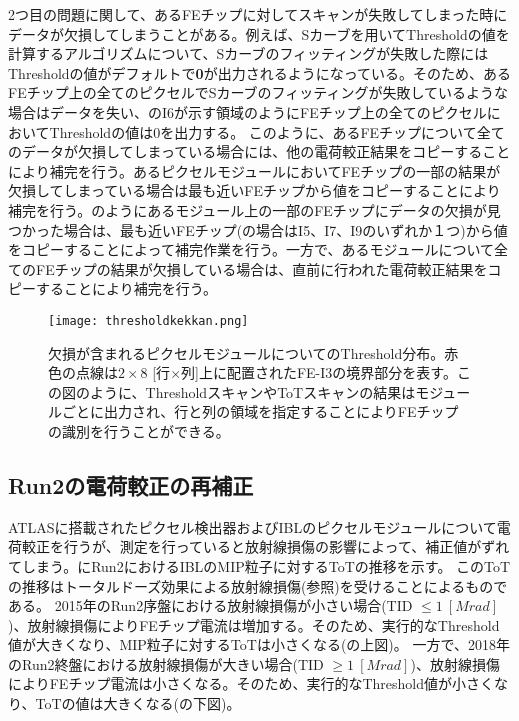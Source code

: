 2つ目の問題に関して、あるFEチップに対してスキャンが失敗してしまった時にデータが欠損してしまうことがある。例えば、Sカーブを用いてThresholdの値を計算するアルゴリズムについて、Sカーブのフィッティングが失敗した際にはThresholdの値がデフォルトで\textbf{0}が出力されるようになっている。そのため、あるFEチップ上の全てのピクセルでSカーブのフィッティングが失敗しているような場合はデータを失い、のI6が示す領域のようにFEチップ上の全てのピクセルにおいてThresholdの値は$0$を出力する。
このように、あるFEチップについて全てのデータが欠損してしまっている場合には、他の電荷較正結果をコピーすることにより補完を行う。あるピクセルモジュールにおいてFEチップの一部の結果が欠損してしまっている場合は最も近いFEチップから値をコピーすることにより補完を行う。のようにあるモジュール上の一部のFEチップにデータの欠損が見つかった場合は、最も近いFEチップ(の場合はI5、I7、I9のいずれか１つ)から値をコピーすることによって補完作業を行う。一方で、あるモジュールについて全てのFEチップの結果が欠損している場合は、直前に行われた電荷較正結果をコピーすることにより補完を行う。

\begin{figure}[tbp]
  \centering
  \texttt{[image: thresholdkekkan.png]}
  \caption[欠損が含まれるピクセルモジュールについてのThreshold分布]{欠損が含まれるピクセルモジュールについてのThreshold分布。赤色の点線は$2\times8$ [行$\times$列]上に配置されたFE-I3の境界部分を表す。この図のように、ThresholdスキャンやToTスキャンの結果はモジュールごとに出力され、行と列の領域を指定することによりFEチップの識別を行うことができる。}
  \label{fig:thresholdkekkan}
\end{figure}

\subsection{Run2の電荷較正の再補正}
\label{sec:prehosei}

ATLASに搭載されたピクセル検出器およびIBLのピクセルモジュールについて電荷較正を行うが、測定を行っていると放射線損傷の影響によって、補正値がずれてしまう。にRun2におけるIBLのMIP粒子に対するToTの推移を示す。
このToTの推移はトータルドーズ効果による放射線損傷(参照)を受けることによるものである。
2015年のRun2序盤における放射線損傷が小さい場合(TID $\leq1\ [\si{Mrad}]$)、放射線損傷によりFEチップ電流は増加する。そのため、実行的なThreshold値が大きくなり、MIP粒子に対するToTは小さくなる(の上図)。
一方で、2018年のRun2終盤における放射線損傷が大きい場合(TID $\geq1\ [\si{Mrad}]$)、放射線損傷によりFEチップ電流は小さくなる。そのため、実行的なThreshold値が小さくなり、ToTの値は大きくなる(の下図)。

